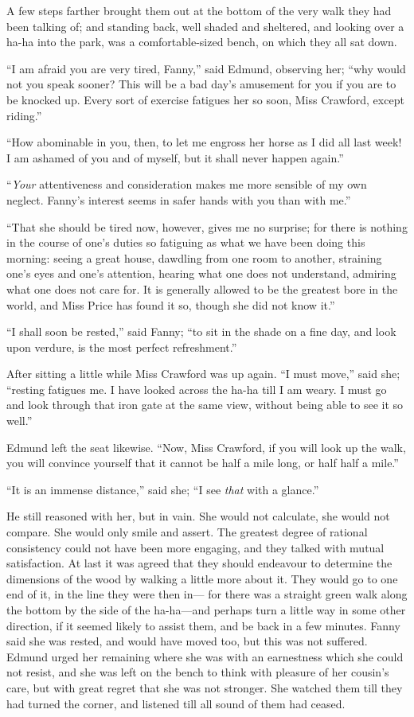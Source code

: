 A few steps farther brought them out at the bottom of the
very walk they had been talking of; and standing back,
well shaded and sheltered, and looking over a ha-ha into
the park, was a comfortable-sized bench, on which they
all sat down.

``I am afraid you are very tired, Fanny,'' said Edmund,
observing her; ``why would not you speak sooner?  This will be
a bad day's amusement for you if you are to be knocked up.
Every sort of exercise fatigues her so soon, Miss Crawford,
except riding.''

``How abominable in you, then, to let me engross her horse
as I did all last week!  I am ashamed of you and of myself,
but it shall never happen again.''

``\emph{Your} attentiveness and consideration makes me more
sensible of my own neglect.  Fanny's interest seems
in safer hands with you than with me.''

``That she should be tired now, however, gives me no surprise;
for there is nothing in the course of one's duties
so fatiguing as what we have been doing this morning:
seeing a great house, dawdling from one room to another,
straining one's eyes and one's attention, hearing what one
does not understand, admiring what one does not care for.
It is generally allowed to be the greatest bore in the world,
and Miss Price has found it so, though she did not
know it.''

``I shall soon be rested,'' said Fanny; ``to sit
in the shade on a fine day, and look upon verdure,
is the most perfect refreshment.''

After sitting a little while Miss Crawford was up again.
``I must move,'' said she; ``resting fatigues me.
I have looked across the ha-ha till I am weary.  I must
go and look through that iron gate at the same view,
without being able to see it so well.''

Edmund left the seat likewise.  ``Now, Miss Crawford,
if you will look up the walk, you will convince yourself
that it cannot be half a mile long, or half half a mile.''

``It is an immense distance,'' said she; ``I see \emph{that}
with a glance.''

He still reasoned with her, but in vain.  She would
not calculate, she would not compare.  She would only
smile and assert.  The greatest degree of rational
consistency could not have been more engaging, and they
talked with mutual satisfaction.  At last it was agreed
that they should endeavour to determine the dimensions
of the wood by walking a little more about it.  They would
go to one end of it, in the line they were then in---%
for there was a straight green walk along the bottom
by the side of the ha-ha---and perhaps turn a little way
in some other direction, if it seemed likely to assist them,
and be back in a few minutes.  Fanny said she was rested,
and would have moved too, but this was not suffered.
Edmund urged her remaining where she was with an
earnestness which she could not resist, and she was left
on the bench to think with pleasure of her cousin's care,
but with great regret that she was not stronger.
She watched them till they had turned the corner,
and listened till all sound of them had ceased.




